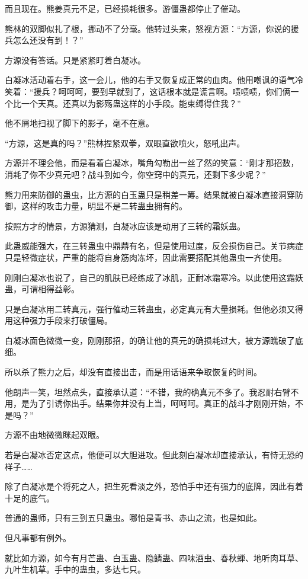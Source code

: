 \begin{this_body}
而且现在。熊姜真元不足，已经损耗很多。游僵蛊都停止了催动。

熊林的双脚似扎了根，挪动不了分毫。他转过头来，怒视方源：“方源，你说的援兵怎么还没有到！？”

方源没有答话。只是紧紧盯着白凝冰。

白凝冰活动着右手，这一会儿，他的右手又恢复成正常的血肉。他用嘲讽的语气冷笑着：“援兵？呵呵呵，要到早就到了，这话根本就是谎言啊。啧啧啧，你们俩一个比一个天真。还真以为影殇蛊这样的小手段。能束缚得住我？”

他不屑地扫视了脚下的影子，毫不在意。

“方源，这是真的吗？”熊林捏紧双拳，双眼直欲喷火，怒吼出声。

方源并不理会他，而是看着白凝冰，嘴角勾勒出一丝了然的笑意：“刚才那招数，消耗了你不少真元吧？战斗到如今，你空窍中的真元，还剩下多少呢？”

熊力用来防御的蛊虫，比方源的白玉蛊只是稍差一筹。结果就被白凝冰直接洞穿防御，这样的攻击力量，明显不是二转蛊虫拥有的。

按照方才的情景，方源猜测，白凝冰应该是动用了三转的霜妖蛊。

此蛊威能强大，在三转蛊虫中鼎鼎有名，但是使用过度，反会损伤自己。关节病症只是轻微症状，严重的能将自身筋肉冻坏，因此需要搭配其他蛊虫一齐使用。

刚刚白凝冰也说了，自己的肌肤已经练成了冰肌，正耐冰霜寒冷。以此使用这霜妖蛊，可谓相得益彰。

只是白凝冰用二转真元，强行催动三转蛊虫，必定真元有大量损耗。但他必须又得用这种强力手段来打破僵局。

白凝冰面色微微一变，刚刚那招，的确让他的真元的确损耗过大，被方源瞧破了底细。

所以杀了熊力之后，却没有直接出击，而是用话语来争取恢复的时间。

他朗声一笑，坦然点头，直接承认道：“不错，我的确真元不多了。我忍耐右臂不用，是为了引诱你出手。结果你并没有上当，呵呵呵。真正的战斗才刚刚开始，不是吗？”

方源不由地微微眯起双眼。

若是白凝冰否定这点，他便可以大胆进攻。但此刻白凝冰却直接承认，有恃无恐的样子……

除了白凝冰是个将死之人，把生死看淡之外，恐怕手中还有强力的底牌，因此有着十足的底气。

普通的蛊师，只有三到五只蛊虫。哪怕是青书、赤山之流，也是如此。

但凡事都有例外。

就比如方源，如今有月芒蛊、白玉蛊、隐鳞蛊、四味酒虫、春秋蝉、地听肉耳草、九叶生机草。手中的蛊虫，多达七只。


\end{this_body}
